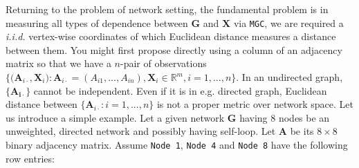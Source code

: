 \documentclass[12pt]{article}
\theoremstyle{definition}
\begin{document}
Returning to the problem of network setting, the fundamental problem is in measuring all types of dependence between $\boldsymbol{G}$ and $\boldsymbol{X}$ via \texttt{MGC}, we are required a \textit{i.i.d.} vertex-wise coordinates of which Euclidean distance measures a distance between them. You might first propose directly using a column of an adjacency matrix so that we have a $n$-pair of observations $\big\{ \big( \boldsymbol{A}_{i \cdot} , \boldsymbol{X}_{i} \big) : \boldsymbol{A}_{i \cdot} = (A_{i 1} , ... , A_{i n} ), \boldsymbol{X}_{i} \in \mathbb{R}^{m}, i=1,...,n  \big\}.$ In an undirected graph, $\{ \mathbf{A_{i \cdot}}  \}$ cannot be independent. Even if it is in e.g. directed graph, Euclidean distance between $\{ \boldsymbol{A}_{i \cdot} : i =1, ... , n \}$ is not a proper metric over network space. Let us introduce a simple example. Let a given network $\boldsymbol{G}$ having 8 nodes be an unweighted, directed network and possibly having self-loop. Let $\boldsymbol{A}$ be its $8 \times 8$ binary adjacency matrix. Assume \texttt{Node 1}, \texttt{Node 4} and \texttt{Node 8} have the following row entries:
	
\end{document}
